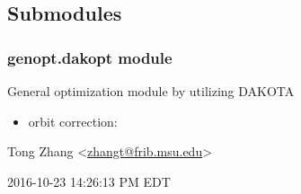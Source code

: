 \documentclass[letterpaper,10pt,english]{sphinxmanual}
\begin{document}
\subsection{Submodules}
\label{\detokenize{src/apidocs/genopt:submodules}}

\subsubsection{genopt.dakopt module}
\label{\detokenize{src/apidocs/dakopt:module-genopt.dakopt}}\label{\detokenize{src/apidocs/dakopt:genopt-dakopt-module}}\label{\detokenize{src/apidocs/dakopt::doc}}
General optimization module by utilizing DAKOTA
\begin{itemize}
\item {} 
orbit correction: 

\end{itemize}

Tong Zhang \textless{}\href{mailto:zhangt@frib.msu.edu}{zhangt@frib.msu.edu}\textgreater{}

2016-10-23 14:26:13 PM EDT
\end{document}
